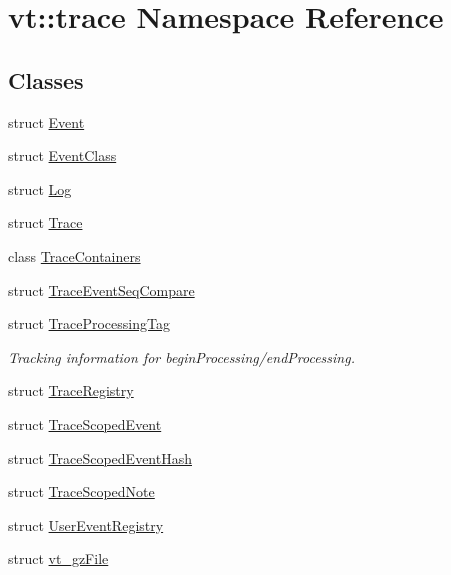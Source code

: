 \hypertarget{namespacevt_1_1trace}{}\section{vt\+:\+:trace Namespace Reference}
\label{namespacevt_1_1trace}
\subsection*{Classes}
\begin{DoxyCompactItemize}
\item 
struct \hyperlink{structvt_1_1trace_1_1_event}{Event}
\item 
struct \hyperlink{structvt_1_1trace_1_1_event_class}{Event\+Class}
\item 
struct \hyperlink{structvt_1_1trace_1_1_log}{Log}
\item 
struct \hyperlink{structvt_1_1trace_1_1_trace}{Trace}
\item 
class \hyperlink{classvt_1_1trace_1_1_trace_containers}{Trace\+Containers}
\item 
struct \hyperlink{structvt_1_1trace_1_1_trace_event_seq_compare}{Trace\+Event\+Seq\+Compare}
\item 
struct \hyperlink{structvt_1_1trace_1_1_trace_processing_tag}{Trace\+Processing\+Tag}
\begin{DoxyCompactList}\small\item\em Tracking information for begin\+Processing/end\+Processing. \end{DoxyCompactList}\item 
struct \hyperlink{structvt_1_1trace_1_1_trace_registry}{Trace\+Registry}
\item 
struct \hyperlink{structvt_1_1trace_1_1_trace_scoped_event}{Trace\+Scoped\+Event}
\item 
struct \hyperlink{structvt_1_1trace_1_1_trace_scoped_event_hash}{Trace\+Scoped\+Event\+Hash}
\item 
struct \hyperlink{structvt_1_1trace_1_1_trace_scoped_note}{Trace\+Scoped\+Note}
\item 
struct \hyperlink{structvt_1_1trace_1_1_user_event_registry}{User\+Event\+Registry}
\item 
struct \hyperlink{structvt_1_1trace_1_1vt__gz_file}{vt\+\_\+gz\+File}
\end{DoxyCompactItemize}
